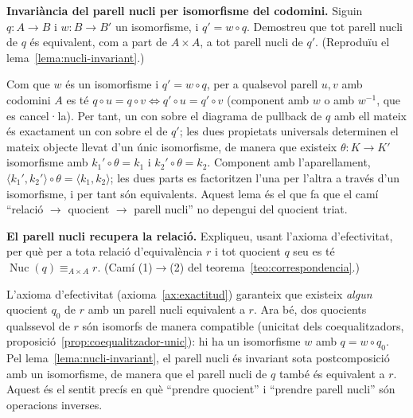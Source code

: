 \begin{exercici}
\textbf{Invariància del parell nucli per isomorfisme del codomini.} Siguin \(q\colon A\to B\) i \(w\colon B\to B'\) un isomorfisme, i \(q'=w\circ q\). Demostreu que tot parell nucli de \(q\) és equivalent, com a part de \(A\times A\), a tot parell nucli de \(q'\). (Reproduïu el lema~\ref{lema:nucli-invariant}.)
\end{exercici}
\begin{solucio}
Com que \(w\) és un isomorfisme i \(q'=w\circ q\), per a qualsevol parell \(u,v\) amb codomini \(A\) es té \(q\circ u=q\circ v\iff q'\circ u=q'\circ v\) (component amb \(w\) o amb \(w^{-1}\), que es cancel·la). Per tant, un con sobre el diagrama de pullback de \(q\) amb ell mateix és exactament un con sobre el de \(q'\); les dues propietats universals determinen el mateix objecte llevat d'un únic isomorfisme, de manera que existeix \(\theta\colon K\to K'\) isomorfisme amb \(k_1'\circ\theta=k_1\) i \(k_2'\circ\theta=k_2\). Component amb l'aparellament, \(\langle k_1',k_2'\rangle\circ\theta=\langle k_1,k_2\rangle\); les dues parts es factoritzen l'una per l'altra a través d'un isomorfisme, i per tant són equivalents. Aquest lema és el que fa que el camí \enquote{relació \(\to\) quocient \(\to\) parell nucli} no depengui del quocient triat.
\end{solucio}

\begin{exercici}
\textbf{El parell nucli recupera la relació.} Expliqueu, usant l'axioma d'efectivitat, per què per a tota relació d'equivalència \(r\) i tot quocient \(q\) seu es té \(\operatorname{Nuc}(q)\equiv_{A\times A}r\). (Camí (1)$\to$(2) del teorema~\ref{teo:correspondencia}.)
\end{exercici}
\begin{solucio}
L'axioma d'efectivitat (axioma~\ref{ax:exactitud}) garanteix que existeix \emph{algun} quocient \(q_0\) de \(r\) amb un parell nucli equivalent a \(r\). Ara bé, dos quocients qualssevol de \(r\) són isomorfs de manera compatible (unicitat dels coequalitzadors, proposició~\ref{prop:coequalitzador-unic}): hi ha un isomorfisme \(w\) amb \(q=w\circ q_0\). Pel lema~\ref{lema:nucli-invariant}, el parell nucli és invariant sota postcomposició amb un isomorfisme, de manera que el parell nucli de \(q\) també és equivalent a \(r\). Aquest és el sentit precís en què \enquote{prendre quocient} i \enquote{prendre parell nucli} són operacions inverses.
\end{solucio}

